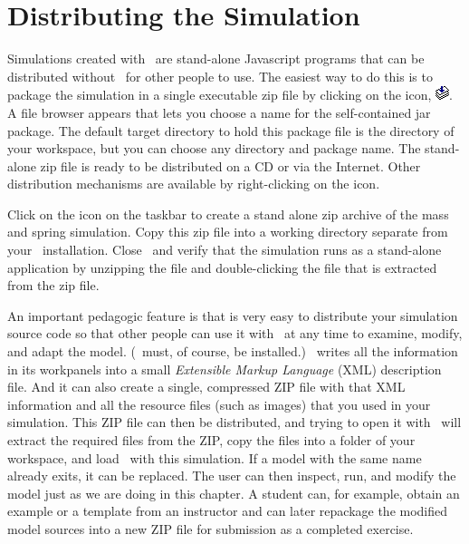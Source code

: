 \section{Distributing the Simulation}\label{section:03ExplorationJavascriptDistributing}
%
Simulations created with \ejs\ are stand-alone Javascript programs that can be distributed without \ejs\ for other people to use.  The easiest way to do this is to package the simulation in a single executable zip file by clicking on the  icon, \includegraphics[scale=\linescale]{../_common/icons_png/package.png}. A file browser appears that lets you choose a name for the self-contained jar package.  The default target directory to hold this package file is the  directory of your workspace, but you can choose any directory and package name. The stand-alone zip file is ready to be distributed on a CD or via the Internet.  Other distribution mechanisms are available by right-clicking on the icon.

\begin{exercise}\label{ex:03ExplorationJavascript/distribution}
Click on the  icon on the taskbar to create a stand alone zip archive of the mass and spring simulation.  Copy this zip file into a working directory separate from your \ejs\ installation.  Close \ejs\ and verify that the simulation runs as a stand-alone application by unzipping the file and double-clicking the  file that is extracted from the zip file.
\end{exercise}

An important pedagogic feature is that is very easy to distribute your simulation source code so that other people can use it with \ejs\ at any time to examine, modify, and adapt the model. (\ejs\ must, of course, be installed.)  \ejs\ writes all the information in its workpanels into a small \emph{Extensible Markup Language} (XML) description file. And it can also create a single, compressed ZIP file with that XML information and all the resource files (such as images) that you used in your simulation. This ZIP file can then be distributed, and trying to open it with \ejs\ will extract the required files from the ZIP, copy the files into a folder of your workspace, and load \ejs\ with this simulation. If a model with the same name already exits, it can be replaced. The user can then inspect, run, and modify the model just as we are doing in this chapter.  A student can, for example, obtain an example or a template from an instructor and can later repackage the modified model sources into a new ZIP file for submission as a completed exercise.

